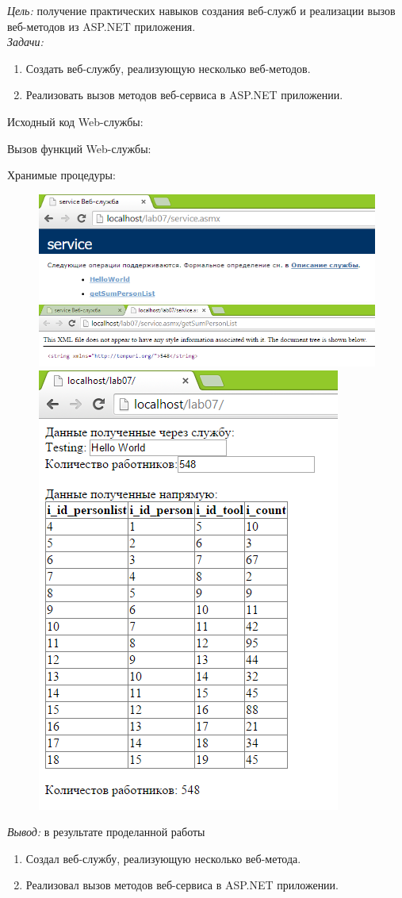 \documentclass[pscyr]{hedlab}
\begin{document}
    \makeheader
    \emph{Цель:} получение практических навыков создания веб-служб и реализации вызов веб-методов 
    из ASP.NET приложения.\\
    \emph{Задачи:} 
    \begin{enumerate}
        \item Создать веб-службу, реализующую несколько веб-методов.
        \item Реализовать вызов методов веб-сервиса в ASP.NET приложении.
    \end{enumerate}
    Исходный код Web-службы:
    
    Вызов функций Web-службы:
    
    Хранимые процедуры:
    

    \pagebreak

    \begin{figure}[h!]
        \center
        \includegraphics[width=.60\textwidth]{lab07_02} \\
        \includegraphics[width=.60\textwidth]{lab07_03} \\
        \includegraphics[width=.47\textwidth]{lab07_01}
    \end{figure}

    \emph{Вывод:} в результате проделанной работы
    \begin{enumerate}
        \item Создал веб-службу, реализующую несколько веб-метода.
        \item Реализовал вызов методов веб-сервиса в ASP.NET приложении.
    \end{enumerate}
\end{document}
